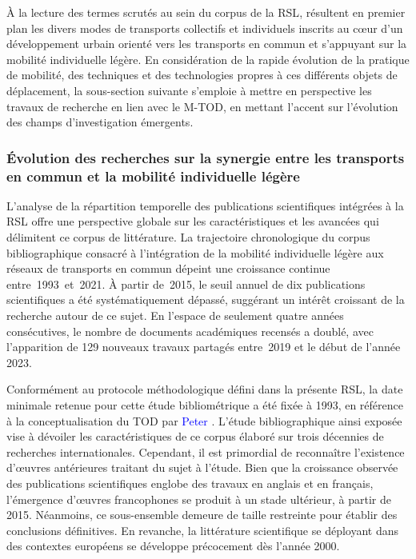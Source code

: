 \begin{refsegment}
À la lecture des termes scrutés au sein du corpus de la \acrshort{RSL}, résultent en premier plan les divers modes de transports collectifs et individuels inscrits au cœur d'un développement urbain orienté vers les transports en commun et s'appuyant sur la mobilité individuelle légère. En considération de la rapide évolution de la pratique de mobilité, des techniques et des technologies propres à ces différents objets de déplacement, la sous-section suivante s'emploie à mettre en perspective les travaux de recherche en lien avec le \acrshort{M-TOD}, en mettant l'accent sur l'évolution des champs d'investigation émergents.%

\subsubsection*{Évolution des recherches sur la synergie entre les transports en commun et la mobilité individuelle légère
    \label{chap2:evolution-recherches-tc-mobilite-individuelle-legere}
    }
    
L'analyse de la répartition temporelle des publications scientifiques intégrées à la \acrshort{RSL} offre une perspective globale sur les caractéristiques et les avancées qui délimitent ce corpus de littérature. La trajectoire chronologique du corpus bibliographique consacré à l'intégration de la mobilité individuelle légère aux réseaux de transports en commun dépeint une croissance continue entre~1993~et~2021. À partir de~2015, le seuil annuel de dix publications scientifiques a été systématiquement dépassé, suggérant un intérêt croissant de la recherche autour de ce sujet. En l'espace de seulement quatre années consécutives, le nombre de documents académiques recensés a doublé, avec l'apparition de 129 nouveaux travaux partagés entre~2019 et le début de l'année 2023.%

Conformément au protocole méthodologique défini dans la présente \acrshort{RSL}, la date minimale retenue pour cette étude bibliométrique a été fixée à 1993, en référence à la conceptualisation du \acrshort{TOD} par \textcolor{blue}{Peter} \textcolor{blue}{\textcite{calthorpe_next_1993}}. L'étude bibliographique ainsi exposée vise à dévoiler les caractéristiques de ce corpus élaboré sur trois décennies de recherches internationales. Cependant, il est primordial de reconnaître l'existence d'œuvres antérieures traitant du sujet à l'étude. Bien que la croissance observée des publications scientifiques englobe des travaux en anglais et en français, l'émergence d'œuvres francophones se produit à un stade ultérieur, à partir de 2015. Néanmoins, ce sous-ensemble demeure de taille restreinte pour établir des conclusions définitives. En revanche, la littérature scientifique se déployant dans des contextes européens se développe précocement dès l'année 2000.%


\end{refsegment}
